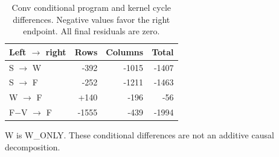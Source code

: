 \begin{table}[t]
\centering
\caption{Conv conditional program and kernel cycle differences. Negative values favor the right endpoint. All final residuals are zero.}
\label{tab:conv-controls-kernels}
\begin{tabular}{lrrr}
\hline
Left $\rightarrow$ right & Rows & Columns & Total \\
\hline
S $\rightarrow$ W & -392 & -1015 & -1407 \\
S $\rightarrow$ F & -252 & -1211 & -1463 \\
W $\rightarrow$ F & +140 & -196 & -56 \\
F$-$V $\rightarrow$ F & -1555 & -439 & -1994 \\
\hline
\end{tabular}
{\footnotesize W is W\_ONLY. These conditional differences are not an additive causal decomposition.}
\end{table}
